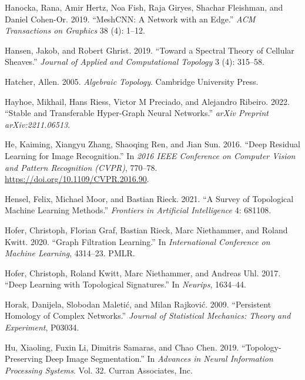 \documentclass[
  12pt,
]{krantz}
\newlength{\cslhangindent}
\newenvironment{CSLReferences}[2] %
 {\begin{list}{}{%
  \setlength{\itemindent}{0pt}
  \setlength{\leftmargin}{0pt}
  \setlength{\parsep}{0pt}
  \ifodd #1
   \setlength{\leftmargin}{\cslhangindent}
   \setlength{\itemindent}{-1\cslhangindent}
  \fi
  \setlength{\itemsep}{#2\baselineskip}}}
 {\end{list}}
\begin{document}
\begin{CSLReferences}{1}{0}
Hanocka, Rana, Amir Hertz, Noa Fish, Raja Giryes, Shachar Fleishman, and
Daniel Cohen-Or. 2019. {``Mesh{CNN}: A Network with an Edge.''}
\emph{ACM Transactions on Graphics} 38 (4): 1--12.

Hansen, Jakob, and Robert Ghrist. 2019. {``Toward a Spectral Theory of
Cellular Sheaves.''} \emph{Journal of Applied and Computational
Topology} 3 (4): 315--58.

Hatcher, Allen. 2005. \emph{Algebraic Topology}. Cambridge University
Press.

Hayhoe, Mikhail, Hans Riess, Victor M Preciado, and Alejandro Ribeiro.
2022. {``Stable and Transferable Hyper-Graph Neural Networks.''}
\emph{arXiv Preprint arXiv:2211.06513}.

He, Kaiming, Xiangyu Zhang, Shaoqing Ren, and Jian Sun. 2016. {``Deep
Residual Learning for Image Recognition.''} In \emph{2016 {IEEE}
{C}onference on {C}omputer {V}ision and {P}attern {R}ecognition
({CVPR})}, 770--78. \url{https://doi.org/10.1109/CVPR.2016.90}.

Hensel, Felix, Michael Moor, and Bastian Rieck. 2021. {``A Survey of
Topological Machine Learning Methods.''} \emph{Frontiers in Artificial
Intelligence} 4: 681108.

Hofer, Christoph, Florian Graf, Bastian Rieck, Marc Niethammer, and
Roland Kwitt. 2020. {``Graph Filtration Learning.''} In
\emph{International Conference on Machine Learning}, 4314--23. PMLR.

Hofer, Christoph, Roland Kwitt, Marc Niethammer, and Andreas Uhl. 2017.
{``Deep Learning with Topological Signatures.''} In \emph{Neurips},
1634--44.

Horak, Danijela, Slobodan Maletić, and Milan Rajković. 2009.
{``Persistent Homology of Complex Networks.''} \emph{Journal of
Statistical Mechanics: Theory and Experiment}, P03034.

Hu, Xiaoling, Fuxin Li, Dimitris Samaras, and Chao Chen. 2019.
{``Topology-Preserving Deep Image Segmentation.''} In \emph{Advances in
{Neural} {Information} {Processing} {Systems}}. Vol. 32. Curran
Associates, Inc.


\end{CSLReferences}
\end{document}
